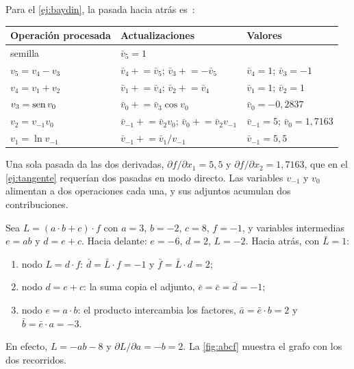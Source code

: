 \begin{ejemplo}\label{ej:adjunta}
Para el \cref{ej:baydin}, la pasada hacia atrás es~\cite[tabla~3]{baydin}:
\begin{center}\small
\begin{tabular}{@{}lll@{}}
\toprule
Operación procesada & Actualizaciones & Valores \\
\midrule
semilla & $\bar v_5=1$ & \\
$v_5=v_4-v_3$ & $\bar v_4\mathrel{+}=\bar v_5$; $\bar v_3\mathrel{+}=-\bar v_5$ & $\bar v_4=1$; $\bar v_3=-1$ \\
$v_4=v_1+v_2$ & $\bar v_1\mathrel{+}=\bar v_4$; $\bar v_2\mathrel{+}=\bar v_4$ & $\bar v_1=1$; $\bar v_2=1$ \\
$v_3=\operatorname{sen} v_0$ & $\bar v_0\mathrel{+}=\bar v_3\cos v_0$ & $\bar v_0=-0{,}2837$ \\
$v_2=v_{-1}v_0$ & $\bar v_{-1}\mathrel{+}=\bar v_2v_0$; $\bar v_0\mathrel{+}=\bar v_2v_{-1}$ & $\bar v_{-1}=5$; $\bar v_0=1{,}7163$ \\
$v_1=\ln v_{-1}$ & $\bar v_{-1}\mathrel{+}=\bar v_1/v_{-1}$ & $\bar v_{-1}=5{,}5$ \\
\bottomrule
\end{tabular}
\end{center}
Una sola pasada da las dos derivadas, $\partial f/\partial x_1=5{,}5$ y $\partial f/\partial x_2=1{,}7163$, que en el \cref{ej:tangente} requerían dos pasadas en modo directo. Las variables $v_{-1}$ y $v_0$ alimentan a dos operaciones cada una, y sus adjuntos acumulan dos contribuciones.
\end{ejemplo}

\begin{ejemplo}\label{ej:abcf}
Sea $L=(a\cdot b+c)\cdot f$ con $a=3$, $b=-2$, $c=8$, $f=-1$, y variables intermedias $e=ab$ y $d=e+c$. Hacia delante: $e=-6$, $d=2$, $L=-2$. Hacia atrás, con $\bar L=1$:
\begin{enumerate}[label=\arabic*.]
  \item nodo $L=d\cdot f$: $\bar d=\bar L\cdot f=-1$ y $\bar f=\bar L\cdot d=2$;
  \item nodo $d=e+c$: la suma copia el adjunto, $\bar e=\bar c=\bar d=-1$;
  \item nodo $e=a\cdot b$: el producto intercambia los factores, $\bar a=\bar e\cdot b=2$ y $\bar b=\bar e\cdot a=-3$.
\end{enumerate}
En efecto, $L=-ab-8$ y $\partial L/\partial a=-b=2$. La \cref{fig:abcf} muestra el grafo con los dos recorridos.
\end{ejemplo}

